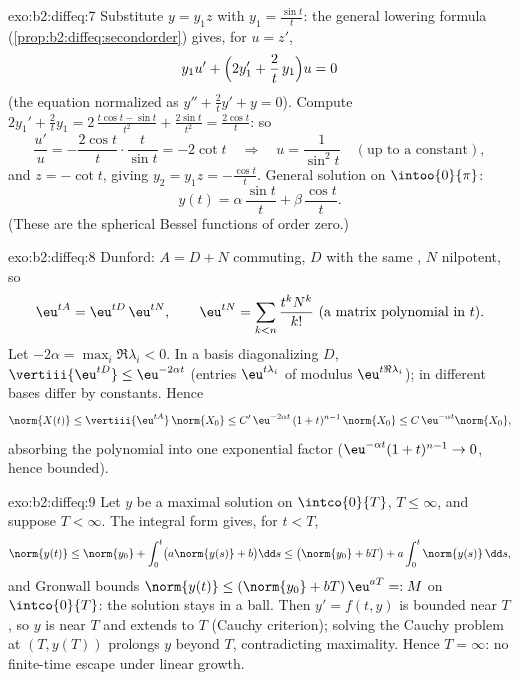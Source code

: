 \begin{solution}{exo:b2:diffeq:7}
Substitute $y = y_1 z$ with $y_1 = \frac{\sin t}{t}$: the general
lowering formula (\cref{prop:b2:diffeq:secondorder}) gives, for $u
= z'$,
\[
y_1 u' + \Bigl(2y_1' + \frac{2}{t}\,y_1\Bigr)u = 0
\]
(the equation normalized as $y'' + \frac2t y' + y = 0$). Compute
$2y_1' + \frac2t y_1 = 2\,\frac{t\cos t - \sin t}{t^2} +
\frac{2\sin t}{t^2} = \frac{2\cos t}{t}$: so
\[
\frac{u'}{u} = -\frac{2\cos t}{t}\cdot\frac{t}{\sin t}
= -2\cot t
\quad\Longrightarrow\quad
u = \frac{1}{\sin^2 t}
\quad (\text{up to a constant}),
\]
and $z = -\cot t$, giving $y_2 = y_1 z = -\frac{\cos t}{t}$.
General solution on $\intoo{0}{\pi}$:
\[
y(t) = \alpha\,\frac{\sin t}{t} + \beta\,\frac{\cos t}{t} .
\]
(These are the spherical Bessel functions of order zero.)
\end{solution}

\begin{solution}{exo:b2:diffeq:8}
Dunford: $A = D + N$ commuting, $D$  with the same
, $N$ nilpotent, so
\[
\eu^{tA} = \eu^{tD}\,\eu^{tN},
\qquad
\eu^{tN} = \sum_{k < n} \frac{t^kN^k}{k!}
\ \text{(a matrix polynomial in } t).
\]
Let $-2\alpha = \max_i \Re\lambda_i < 0$. In a basis diagonalizing
$D$, $\vertiii{\eu^{tD}} \leq \eu^{-2\alpha t}$ (entries
$\eu^{t\lambda_i}$ of modulus $\eu^{t\Re\lambda_i}$);  in
different bases differ by constants. Hence
\[
\norm{X(t)} \leq \vertiii{\eu^{tA}}\,\norm{X_0}
\leq C'\,\eu^{-2\alpha t}\,(1 + t)^{n-1}\,\norm{X_0}
\leq C\,\eu^{-\alpha t}\norm{X_0} ,
\]
absorbing the polynomial into one exponential factor
($\eu^{-\alpha t}(1+t)^{n-1} \to 0$, hence bounded).
\end{solution}

\begin{solution}{exo:b2:diffeq:9}
Let $y$ be a maximal solution on $\intco{0}{T}$, $T \leq \infty$,
and suppose $T < \infty$. The integral form gives, for $t < T$,
\[
\norm{y(t)} \leq \norm{y_0} + \int_0^t \bigl(a\norm{y(s)} +
b\bigr)\dd s
\leq \bigl(\norm{y_0} + bT\bigr) + a\int_0^t\norm{y(s)}\,\dd s ,
\]
and Gronwall bounds $\norm{y(t)} \leq (\norm{y_0} +
bT)\,\eu^{aT} =: M$ on $\intco{0}{T}$: the solution stays in a
 ball. Then $y' = f(t, y)$ is bounded near $T$, so $y$ is
 near $T$ and extends  to $T$ (Cauchy
criterion); solving the Cauchy problem at $(T, y(T))$ prolongs $y$
beyond $T$, contradicting maximality. Hence $T = \infty$: no
finite-time escape under linear growth.
\end{solution}

